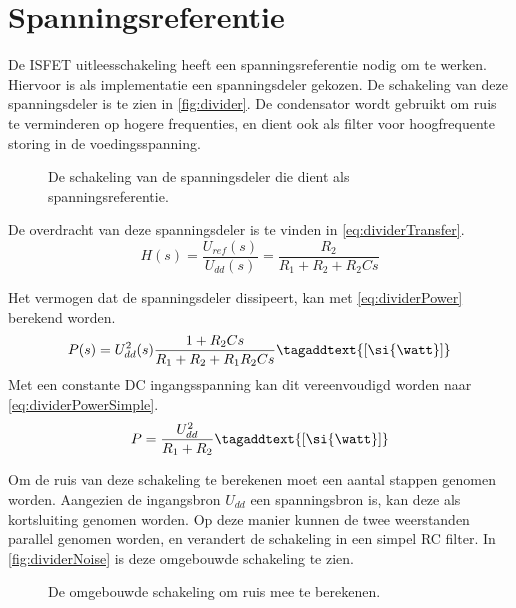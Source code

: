 \section{Spanningsreferentie}\label{sec:referenceVoltage}

De ISFET uitleesschakeling heeft een spanningsreferentie nodig om te werken.
Hiervoor is als implementatie een spanningsdeler gekozen. De schakeling van deze spanningsdeler is te zien in \autoref{fig:divider}.
De condensator wordt gebruikt om ruis te verminderen op hogere frequenties, en dient ook als filter voor hoogfrequente storing in de voedingsspanning.

\begin{figure}[ht]
    \centering
    \def\svgwidth{0.5\textwidth}
    
    \caption{De schakeling van de spanningsdeler die dient als spanningsreferentie.}
    \label{fig:divider}
\end{figure}

\noindent
De overdracht van deze spanningsdeler is te vinden in \autoref{eq:dividerTransfer}.
\begin{equation}\label{eq:dividerTransfer}
    H(s) = \frac{U_{ref}(s)}{U_{dd}(s)} = \frac{R_2}{R_1 + R_2 + R_2Cs}
\end{equation}

\noindent
Het vermogen dat de spanningsdeler dissipeert, kan met \autoref{eq:dividerPower} berekend worden.
\begin{equation}\label{eq:dividerPower}
    P(s) = U_{dd}^2(s)\frac{1+R_2Cs}{R_1 + R_2 + R_1R_2Cs}
    \tagaddtext{[\si{\watt}]}
\end{equation}
Met een constante DC ingangsspanning kan dit vereenvoudigd worden naar \autoref{eq:dividerPowerSimple}.
\begin{equation}\label{eq:dividerPowerSimple}
    P = \frac{U_{dd}^2}{R_1 + R_2}
    \tagaddtext{[\si{\watt}]}
\end{equation}

Om de ruis van deze schakeling te berekenen moet een aantal stappen genomen worden. Aangezien de ingangsbron $U_{dd}$ een spanningsbron is, kan deze als kortsluiting genomen worden. Op deze manier kunnen de twee weerstanden parallel genomen worden, en verandert de schakeling in een simpel RC filter. In \autoref{fig:dividerNoise} is deze omgebouwde schakeling te zien.

\begin{figure}[ht]
    \centering
    \def\svgwidth{0.35\textwidth}
    
    \caption{De omgebouwde schakeling om ruis mee te berekenen.}
    \label{fig:dividerNoise}
\end{figure}

